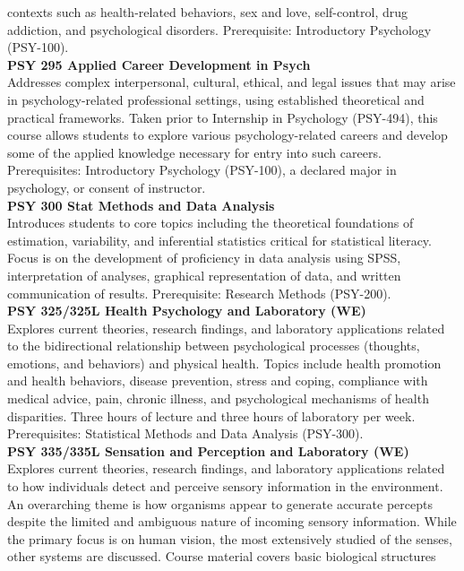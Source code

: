 \documentclass[
  letterpaper,
]{scrbook}
\begin{document}
contexts such as health-related behaviors, sex and love, self-control,
drug addiction, and psychological disorders. Prerequisite: Introductory
Psychology (PSY-100).\\
\textbf{PSY 295 Applied Career Development in Psych}\\
Addresses complex interpersonal, cultural, ethical, and legal issues
that may arise in psychology-related professional settings, using
established theoretical and practical frameworks. Taken prior to
Internship in Psychology (PSY-494), this course allows students to
explore various psychology-related careers and develop some of the
applied knowledge necessary for entry into such careers. Prerequisites:
Introductory Psychology (PSY-100), a declared major in psychology, or
consent of instructor.\\
\textbf{PSY 300 Stat Methods and Data Analysis}\\
Introduces students to core topics including the theoretical foundations
of estimation, variability, and inferential statistics critical for
statistical literacy. Focus is on the development of proficiency in data
analysis using SPSS, interpretation of analyses, graphical
representation of data, and written communication of results.
Prerequisite: Research Methods (PSY-200).\\
\textbf{PSY 325/325L Health Psychology and Laboratory (WE)}\\
Explores current theories, research findings, and laboratory
applications related to the bidirectional relationship between
psychological processes (thoughts, emotions, and behaviors) and physical
health. Topics include health promotion and health behaviors, disease
prevention, stress and coping, compliance with medical advice, pain,
chronic illness, and psychological mechanisms of health disparities.
Three hours of lecture and three hours of laboratory per week.
Prerequisites: Statistical Methods and Data Analysis (PSY-300).\\
\textbf{PSY 335/335L Sensation and Perception and Laboratory (WE)}\\
Explores current theories, research findings, and laboratory
applications related to how individuals detect and perceive sensory
information in the environment. An overarching theme is how organisms
appear to generate accurate percepts despite the limited and ambiguous
nature of incoming sensory information. While the primary focus is on
human vision, the most extensively studied of the senses, other systems
are discussed. Course material covers basic biological structures
\end{document}
